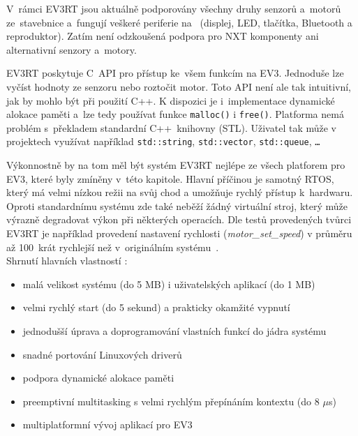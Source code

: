 
V~rámci EV3RT jsou aktuálně podporovány všechny druhy senzorů a~motorů ze~stavebnice \legoEV{} a~fungují veškeré periferie na~ (displej, LED, tlačítka, Bluetooth a reproduktor). 
Zatím není odzkoušená podpora pro NXT komponenty ani alternativní senzory a~motory. 

EV3RT poskytuje C~API pro přístup ke~všem funkcím na EV3. 
Jednoduše lze vyčíst hodnoty ze senzoru nebo roztočit motor.
Toto API není ale tak intuitivní, jak by mohlo být při použití C++.
K dispozici je i~implementace dynamické alokace paměti a~lze tedy používat funkce \verb|malloc()| i \verb|free()|.
Platforma nemá problém s~překladem standardní C++~knihovny (STL).
Uživatel tak může v projektech využívat například \texttt{std::string}, \texttt{std::vector}, \texttt{std::queue}, \texttt{\dots}

Výkonnostně by na tom měl být systém EV3RT nejlépe ze všech platforem pro EV3, které byly zmíněny v~této kapitole. 
Hlavní příčinou je samotný RTOS, který má velmi nízkou režii na svůj chod a umožňuje rychlý přístup k~hardwaru. %
Oproti standardnímu \lego{} systému zde také neběží žádný virtuální stroj, který může výrazně degradovat výkon při některých operacích. 
Dle testů provedených tvůrci EV3RT je například provedení nastavení rychlosti ({\it motor\_set\_speed}) v průměru až 100~krát rychlejší než v~originálním systému~\cite{legoProgramingPlatform_EV3RT-paper}. \\
 
Shrnutí hlavních vlastností \evRT:

\begin{itemize}
	\item malá velikost systému (do 5 MB) i uživatelských aplikací (do 1 MB)
	\item velmi rychlý start (do 5 sekund) a prakticky okamžité vypnutí
	\item jednodušší úprava a doprogramování vlastních funkcí do jádra systému
	\item snadné portování Linuxových driverů
	\item podpora dynamické alokace paměti
	\item preemptivní multitasking s velmi rychlým přepínáním kontextu (do 8 $\mu$s)
	\item multiplatformní vývoj aplikací pro EV3
\end{itemize}
 
